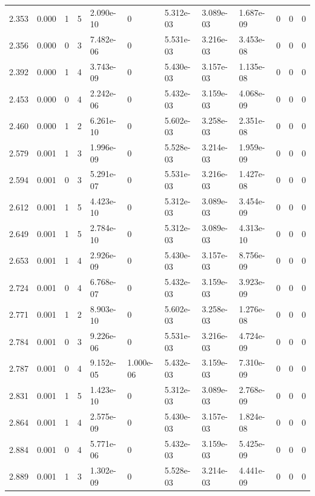 \documentclass[preview]{standalone}
\begin{document}
{{{\begin{tabular}{L{1.2cm}C{1.2cm} C{0.3cm}C{0.5cm} C{1.4cm}C{1.4cm} C{1.4cm}C{1.4cm} C{1.6cm}C{1.6cm} C{1.6cm}C{1.6cm}}
  2.353  &  0.000  & 1     &  5 &  2.090e-10  & 0  &  5.312e-03&   3.089e-03& 1.687e-09 & 0   &  0 & 0  \\ 
  2.356  &  0.000  & 0     &  3 &  7.482e-06  & 0  &  5.531e-03&   3.216e-03& 3.453e-08 & 0   &  0 & 0  \\ 
  2.392  &  0.000  & 1     &  4 &  3.743e-09  & 0  &  5.430e-03&   3.157e-03& 1.135e-08 & 0   &  0 & 0  \\ 
  2.453  &  0.000  & 0     &  4 &  2.242e-06  & 0  &  5.432e-03&   3.159e-03& 4.068e-09 & 0   &  0 & 0  \\ 
  2.460  &  0.000  & 1     &  2 &  6.261e-10  & 0  &  5.602e-03&   3.258e-03& 2.351e-08 & 0   &  0 & 0  \\ 
  2.579  &  0.001  & 1     &  3 &  1.996e-09  & 0  &  5.528e-03&   3.214e-03& 1.959e-09 & 0   &  0 & 0  \\ 
  2.594  &  0.001  & 0     &  3 &  5.291e-07  & 0  &  5.531e-03&   3.216e-03& 1.427e-08 & 0   &  0 & 0  \\ 
  2.612  &  0.001  & 1     &  5 &  4.423e-10  & 0  &  5.312e-03&   3.089e-03& 3.454e-09 & 0   &  0 & 0  \\ 
  2.649  &  0.001  & 1     &  5 &  2.784e-10  & 0  &  5.312e-03&   3.089e-03& 4.313e-10 & 0   &  0 & 0  \\ 
  2.653  &  0.001  & 1     &  4 &  2.926e-09  & 0  &  5.430e-03&   3.157e-03& 8.756e-09 & 0   &  0 & 0  \\ 
  2.724  &  0.001  & 0     &  4 &  6.768e-07  & 0  &  5.432e-03&   3.159e-03& 3.923e-09 & 0   &  0 & 0  \\ 
  2.771  &  0.001  & 1     &  2 &  8.903e-10  & 0  &  5.602e-03&   3.258e-03& 1.276e-08 & 0   &  0 & 0  \\ 
  2.784  &  0.001  & 0     &  3 &  9.226e-06  & 0  &  5.531e-03&   3.216e-03& 4.724e-09 & 0   &  0 & 0  \\ 
  2.787  &  0.001  & 0     &  4 &  9.152e-05  & 1.000e-06  &  5.432e-03&   3.159e-03& 7.310e-09 & 0   &  0 & 0  \\ 
  2.831  &  0.001  & 1     &  5 &  1.423e-10  & 0  &  5.312e-03&   3.089e-03& 2.768e-09 & 0   &  0 & 0  \\ 
  2.864  &  0.001  & 1     &  4 &  2.575e-09  & 0  &  5.430e-03&   3.157e-03& 1.824e-08 & 0   &  0 & 0  \\ 
  2.884  &  0.001  & 0     &  4 &  5.771e-06  & 0  &  5.432e-03&   3.159e-03& 5.425e-09 & 0   &  0 & 0  \\ 
  2.889  &  0.001  & 1     &  3 &  1.302e-09  & 0  &  5.528e-03&   3.214e-03& 4.441e-09 & 0   &  0 & 0  \\ 

\end{tabular}}}}
\end{document}
